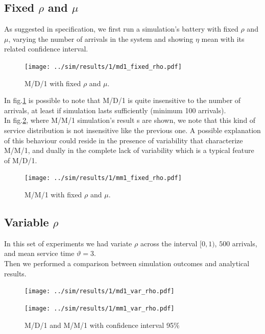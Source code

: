 \documentclass{llncs}
\newcommand{\labelsec}[1]{\label{sec:#1}}
\begin{document}
\newpage
\subsection{Fixed $\rho$ and $\mu$}
\labelsec{MD1_MM1_fixed_rho}

As suggested in specification, we first run a simulation's battery with fixed $\rho$ and $\mu$, varying the number of arrivals in the system and showing $\eta$ mean with its related confidence interval.

\begin{figure}
\centering
\texttt{[image: ../sim/results/1/md1\_fixed\_rho.pdf]}
\caption{M/D/1 with fixed $\rho$ and $\mu$.}
\label{fig:md1_fixed}
\end{figure}

In fig.\ref{fig:md1_fixed} is possible to note that M/D/1 is quite insensitive to the number of arrivals, at least if simulation lasts sufficiently (minimum 100 arrivals).\\
In fig.\ref{fig:mm1_fixed}, where M/M/1 simulation's result s are shown, we note that this kind of service distribution is not insensitive like the previous one. A possible explanation of this behaviour could reside in the presence of variability that characterize M/M/1, and dually in the complete lack of variability which is a typical feature of M/D/1.
 
\begin{figure}
\centering
\texttt{[image: ../sim/results/1/mm1\_fixed\_rho.pdf]}
\caption{M/M/1 with fixed $\rho$ and $\mu$.}
\label{fig:mm1_fixed}
\end{figure}


\newpage
\subsection{Variable $\rho$}
\labelsec{MD1_MM1_fixed_rho}

In this set of experiments we had variate $\rho$ across the interval $[0,1)$, $500$ arrivals, and mean service time $\vartheta=3$.\\
Then we performed a comparison between simulation outcomes and analytical results.
\\
\begin{figure}
\begin{minipage}{7cm}
\centering
\texttt{[image: ../sim/results/1/md1\_var\_rho.pdf]}
\end{minipage}\qquad
\begin{minipage}{7cm}
\centering
\texttt{[image: ../sim/results/1/mm1\_var\_rho.pdf]}
\end{minipage}
\caption{M/D/1 and M/M/1 with confidence interval 95\%}
\label{fig:md1_mm1_varrho_confint}
\end{figure}
\end{document}
